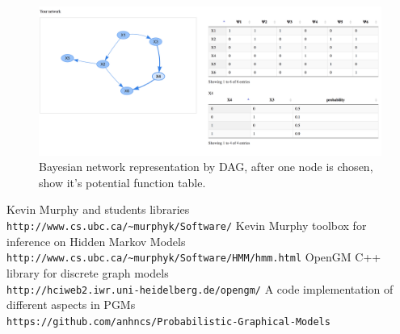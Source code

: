 \documentclass{article}
\begin{document}
    \begin{figure}[h!]
        \includegraphics[width=\linewidth]{img/network_selected_node_table.png}
        \caption{Bayesian network representation by DAG, after one node is chosen, show it's potential function table.}
        \label{fig:besian_network_chosen_node}
    \end{figure}

    \vspace{0.5cm}
    \begin{thebibliography}{9}
        Kevin Murphy and students libraries \\\texttt{http://www.cs.ubc.ca/\~{}murphyk/Software/}
        Kevin Murphy toolbox for inference on Hidden Markov Models \\\texttt{http://www.cs.ubc.ca/\~{}murphyk/Software/HMM/hmm.html}
        OpenGM C++ library for discrete graph models \\\texttt{http://hciweb2.iwr.uni-heidelberg.de/opengm/}
        A code implementation of different aspects in PGMs
        \\\texttt{https://github.com/anhncs/Probabilistic-Graphical-Models}
    \end{thebibliography}
\end{document}
